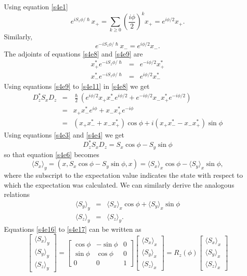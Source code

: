 \documentclass{article}
\numberwithin{equation}{section}
\newcommand{\qev}[1]{\langle #1 \rangle}
\begin{document}
Using equation \eqref{s4e1}
\begin{equation}\label{s4e10}
e^{iS_z\phi/\hslash}x_+ = 
\sum_{k \ge 0}\left(\frac{i\phi}{2}\right)^k x_+ = e^{i\phi/2}x_+.
\end{equation}
Similarly,
\begin{equation}\label{s4e11}
e^{-iS_z\phi/\hslash}x_- = e^{i\phi/2}x_-.
\end{equation}
The adjoints of equations \eqref{s4e8} and \eqref{s4e9} are
\begin{eqnarray}
x_+^\ast e^{-iS_z\phi/\hslash} &=& e^{-i\phi/2}x_+^\ast \label{s4e12} \\
x_-^\ast e^{-iS_z\phi/\hslash} &=& e^{i\phi/2}x_-^\ast \label{s4e13}
\end{eqnarray}
Using equations \eqref{s4e9} to \eqref{s4e11} in \eqref{s4e8} we get
\begin{eqnarray}
D_z^\ast S_x D_z &=& \frac{\hslash}{2}\left(e^{i\phi/2}x_+x_-^\ast e^{i\phi/2}
+ e^{-i\phi/2}x_-x_+^\ast e^{-i\phi/2}\right) \nonumber \\
 &=& x_+x_-^\ast e^{i\phi} + x_-x_+^\ast e^{-i\phi} \nonumber \\
 &=& (x_+x_-^\ast + x_-x_+^\ast)\cos\phi + i(x_+x_-^\ast - x_-x_+^\ast)\sin\phi
\label{s4e14}
\end{eqnarray}
Using equations \eqref{s4e3} and \eqref{s4e4} we get
\begin{equation}\label{s4e15}
D_z^\ast S_x D_z = S_x\cos\phi - S_y\sin\phi
\end{equation}
so that equation \eqref{s4e6} becomes
\begin{equation}\label{s4e16}
\qev{S_x}_y = (x, S_x\cos\phi - S_y\sin\phi, x) = \qev{S_x}_x\cos\phi -
\qev{S_y}_x\sin\phi,
\end{equation}
where the subscript to the expectation value indicates the state with respect
to which the expectation was calculated. We can similarly derive the analogous 
relations
\begin{eqnarray}
\qev{S_y}_y &=& \qev{S_x}_x\cos\phi + \qev{S_y}_x\sin\phi \label{s4e17} \\
\qev{S_z}_y &=& \qev{S_z}_y. \label{s4e18}
\end{eqnarray}
Equations \eqref{s4e16} to \eqref{s4e17} can be written as
\begin{equation}\label{s4e19}
\begin{bmatrix}\qev{S_x}_y \\ \qev{S_y}_y \\ \qev{S_z}_y\end{bmatrix}
= \begin{bmatrix}\cos\phi & -\sin\phi & 0 \\
\sin\phi & \cos\phi & 0 \\
0 & 0 & 1\end{bmatrix}
\begin{bmatrix}\qev{S_x}_x \\ \qev{S_y}_x \\ \qev{S_z}_x\end{bmatrix} =
R_z(\phi)\begin{bmatrix}\qev{S_x}_x \\ \qev{S_y}_x \\ \qev{S_z}_x\end{bmatrix}
\end{equation}
\end{document}
